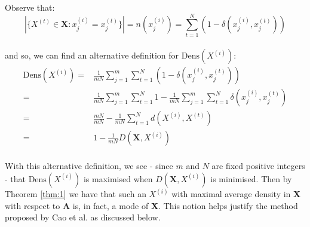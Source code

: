 \noindent Observe that:
\[
	|\{X^{(t)} \in \textbf{X} : x_j^{(i)} = x_j^{(t)}\}| = n(x_j^{(i)}) = 
	\sum_{t=1}^N (1 - \delta(x_j^{(i)}, x_j^{(t)}))
\]\\

and so, we can find an alternative definition for \(\text{Dens}(X^{(i)})\):
\begin{equation}
\begin{aligned}
    \text{Dens}(X^{(i)}) = {} & {} \frac{1}{mN} \sum_{j=1}^m \sum_{t=1}^N 
                         (1 - \delta(x_j^{(i)}, x_j^{(t)}))
    \\
			             = {} & {} \frac{1}{mN} \sum_{j=1}^m \sum_{t=1}^N 1 - 
                         \frac{1}{mN} \sum_{j=1}^m \sum_{t=1}^N 
                         \delta(x_j^{(i)}, x_j^{(t)})
    \\
                         = {} & {} \frac{mN}{mN} - \frac{1}{mN} \sum_{t=1}^N 
                         d(X^{(i)}, X^{(t)})
    \\
			             = {} & {} 1 - \frac{1}{mN} D(\textbf{X}, X^{(i)})
\end{aligned}
\end{equation}\\

With this alternative definition, we see - since \(m\) and \(N\) are fixed 
positive integers - that \(\text{Dens}(X^{(i)})\) is maximised when 
\(D(\textbf{X}, X^{(i)})\) is minimised. Then by Theorem \ref{thm:1} we have
that such an \(X^{(i)}\) with maximal average density in \textbf{X} with respect
to \textbf{A} is, in fact, a mode of \textbf{X}. This notion helps justify the 
method proposed by Cao et al. as discussed below.\\


